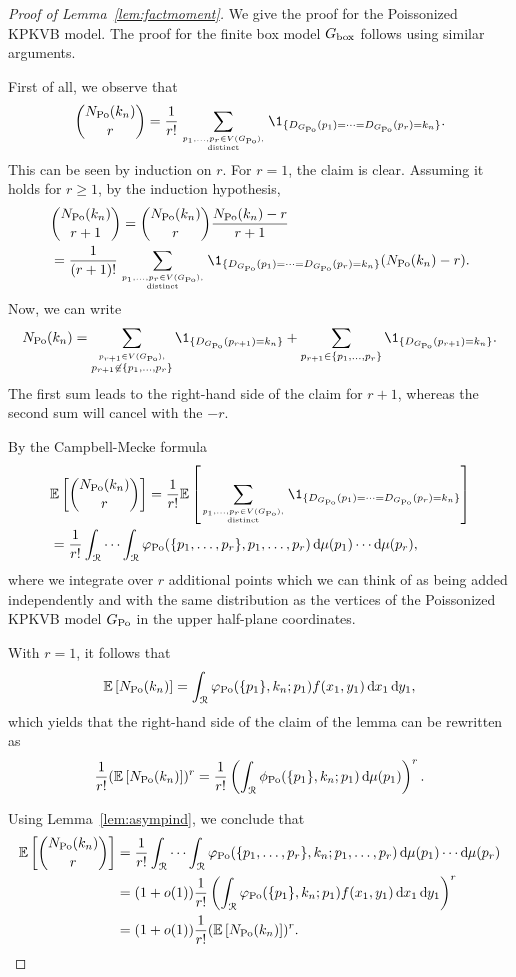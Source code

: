\begin{proof}[Proof of Lemma~\ref{lem:factmoment}]
We give the proof for the Poissonized KPKVB model. The proof for the finite box model $G_{\mathrm{box}}$ follows using similar arguments.

First of all, we observe that
\begin{align*}
{N_{\Po}(k_n) \choose r} = \frac{1}{r!} \sum_{p_1,\dots,p_r\in V(\GPo), \atop \text{distinct}} \1_{\{D_{\GPo}(p_1)=\dots=D_{\GPo}(p_r)=k_n\}}.
\end{align*}
This can be seen by induction on $r$. For $r=1$, the claim is clear. Assuming it holds for $r\geq 1$, by the induction hypothesis,
\begin{align*}
&{N_{\Po}(k_n) \choose r+1} = {N_{\Po}(k_n) \choose r} \frac{N_{\Po}(k_n)-r}{r+1} \\
&= \frac{1}{(r+1)!}\sum_{p_1,\dots,p_r\in V(\GPo), \atop \text{distinct}} \1_{\{D_{\GPo}(p_1)=\dots=D_{\GPo}(p_r)=k_n\}} (N_{\Po}(k_n)-r).
\end{align*}
Now, we can write
\[
	N_{\Po}(k_n) = \sum_{\stackrel{p_{r+1} \in V(\GPo),}{p_{r+1} \not \in\{ p_1,\dots,p_r\}} } \1_{\{D_{\GPo}(p_{r+1})=k_n\}}+\sum_{p_{r+1} \in \{p_1,\dots,p_r\}}\1_{\{D_{\GPo}(p_{r+1})=k_n\}}.
\]
The first sum leads to the right-hand side of the claim for $r+1$, whereas the second sum will cancel with the $-r$.

By the Campbell-Mecke formula 
\begin{align*}
	&\Exp{ {N_{\Po}(k_n) \choose r}}=\frac{1}{r!} \E\left[ \sum_{p_1,\dots,p_r\in V(\GPo), \atop \text{distinct}}  
		\1_{\{D_{\GPo}(p_1)=\dots=D_{\GPo}(p_r)=k_n\}}\right] \\
	&=\frac{1}{r!} \int_\Rcal \cdots \int_\Rcal \varphi_{\Po}(\{p_1,\dots,p_r\},p_1,\dots,p_r)
		\dd \mu(p_1) \cdots \dd \mu(p_{r}),
\end{align*}
where we integrate over $r$ additional points which we can think of as being added independently and with the same distribution as the vertices of the Poissonized KPKVB model $G_{{\mathrm{Po}}}$ in the upper half-plane coordinates.

With $r=1$, it follows that
\[
	\mathbb{E}\left[N_{{\mathrm{Po}}}(k_n)\right] = \int_{{\mathcal R}} \varphi_{{\mathrm{Po}}}(\{p_1\}, k_n ; p_1) f(x_1,y_1) \operatorname{\mathrm{d}\hspace{-2pt}} x_1 \operatorname{\mathrm{d}\hspace{-2pt}} y_1,
\]
which yields that the right-hand side of the claim of the lemma can be rewritten as
\[
	\frac{1}{r!}(\mathbb{E}\left[N_{{\mathrm{Po}}}(k_n)\right])^r = \frac{1}{r!}\left(\int_{{\mathcal R}} \phi_{{\mathrm{Po}}}(\{p_1\}, k_n; p_1) \operatorname{\mathrm{d}\hspace{-2pt}} \mu(p_1)\right)^r.
\]

Using Lemma~\ref{lem:asympind}, we conclude that
\begin{align*}
	\mathbb{E}\left[ { N_{{\mathrm{Po}}}(k_n) \choose r}\right] 
	&= \frac{1}{r!} \int_{{\mathcal R}} \cdots \int_{{\mathcal R}} 
		\varphi_{{\mathrm{Po}}}(\{p_1,\dots,p_r\}, k_n; p_1,\dots,p_r) 
		\operatorname{\mathrm{d}\hspace{-2pt}} \mu(p_1) \cdots \operatorname{\mathrm{d}\hspace{-2pt}} \mu(p_{r}) \\
	&= (1+o(1))\frac{1}{r!}\left(\int_{{\mathcal R}} \varphi_{{\mathrm{Po}}}(\{p_1\}, k_n;p_1) f(x_1,y_1) \operatorname{\mathrm{d}\hspace{-2pt}} x_1 \operatorname{\mathrm{d}\hspace{-2pt}} y_1 \right)^r \\
	&= (1+o(1))\frac{1}{r!}(\mathbb{E}\left[N_{{\mathrm{Po}}}(k_n)\right])^r.
\end{align*}
\end{proof}

